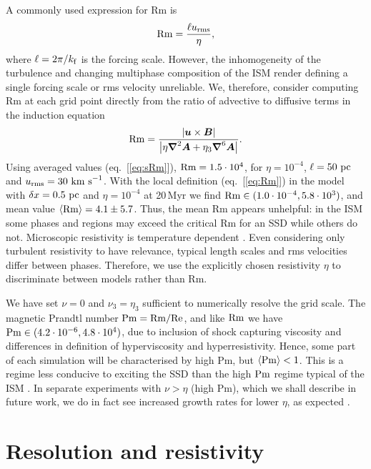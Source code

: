 \documentclass[preprint2]{aastex63}
\newcommand\Rm{{\rm Rm} }
\newcommand\Rey{{\rm Re} }
\newcommand\Pm{{\rm Pm} }
\newcommand\kf{k_{\rm f} }
\newcommand{\vect}[1]{{{\mbox{\boldmath $#1$}}}}%
\newcommand\pc{~ {\rm pc}}
\newcommand\dx{ {\delta x}}
\newcommand\kms{~ {\rm km~ s}^{-1}}
\begin{document}
 A commonly used expression for Rm is 
 \begin{equation}\label{eq:sRm}
 \Rm=\frac{\ell {u_{\rm rms}}}{\eta},
 \end{equation}
 where $\ell = 2 \pi/\kf$ is the forcing scale.
 However, the inhomogeneity of the turbulence and changing multiphase
 composition of the ISM render defining a single forcing scale or rms velocity
 unreliable.
 We, therefore, consider computing Rm at each grid point directly from the
 ratio of advective to diffusive terms in the induction equation
 \begin{eqnarray}\label{eq:Rm}
   \Rm = \frac{\left|\vect{u}\times\vect{B}\right|}{
     \left|\eta\vect\nabla^2\vect{A}+\eta_3\vect\nabla^6\vect{A}\right|}.
 \end{eqnarray}
 Using averaged values (eq.~[\ref{eq:sRm}]), 
 $\Rm = 1.5 \cdot 10^4$, for $\eta=10^{-4}$, $\ell=50\pc$ and
 ${u_{\rm rms}}=30\kms$.
 With the local definition (eq.~[\ref{eq:Rm}]) in the model with 
 $\dx=0.5\pc$ and $\eta=10^{-4}$ at 20\,Myr we find
 $\Rm\in(1.0\cdot10^{-4},5.8\cdot 10^3)$,
 and mean value $\langle\Rm\rangle=4.1\pm5.7$.
 Thus, the mean Rm appears unhelpful:
 in the ISM some phases and regions may exceed the critical Rm for an
 SSD while others do not.
 Microscopic resistivity is temperature dependent \citep{CSR50}.
 Even considering only turbulent resistivity to have relevance, 
 typical length scales and rms velocities differ between phases.
 Therefore, we use the explicitly chosen resistivity $\eta$ to discriminate
 between models rather than Rm.

 We have set $\nu=0$ and $\nu_3=\eta_3$ sufficient to numerically resolve the
 grid scale.
 The magnetic Prandtl number $\Pm = \Rm/\Rey$, and like $\Rm$ we have
 $\Pm\in(4.2\cdot10^{-6},4.8\cdot10^{4})$, due to inclusion of shock capturing
 viscosity and differences in definition of hyperviscosity and hyperresistivity.
 Hence, some part of each simulation will be characterised by high Pm,
 but $\langle\Pm\rangle<1$.
 This is a regime less conducive to exciting the SSD than the high $\Pm$ regime
 typical of the ISM \citep{HBD04}.
 In separate experiments with $\nu>\eta$ (high Pm), which we shall describe in
 future work, we do in fact see increased growth rates for lower $\eta$, as
 expected \citep{Sch07}.
\section{Resolution and resistivity} \label{sec:results}
\end{document}
